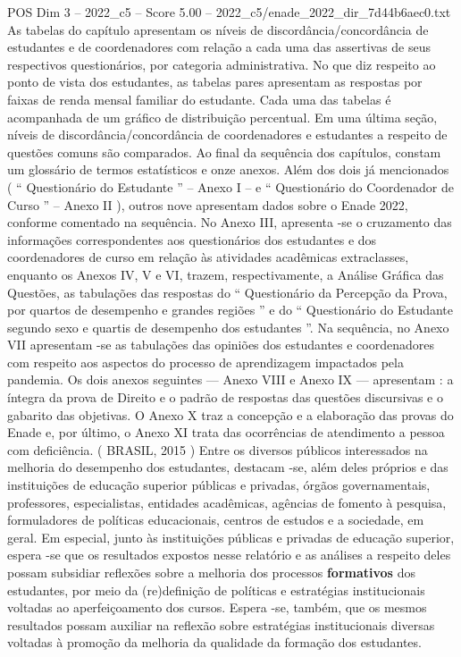 \begin{textsample}{POS Dim 3 – 2022\_c5 – Score 5.00 – 2022\_c5/enade\_2022\_dir\_7d44b6aec0.txt}
As tabelas do capítulo apresentam os níveis de discordância/concordância de estudantes e de coordenadores com relação a cada uma das assertivas de seus respectivos questionários, por categoria administrativa.
No que diz respeito ao ponto de vista dos estudantes, as tabelas pares apresentam as respostas por faixas de renda mensal familiar do estudante.
Cada uma das tabelas é acompanhada de um gráfico de distribuição percentual.
Em uma última seção, níveis de discordância/concordância de coordenadores e estudantes a respeito de questões comuns são comparados.
Ao final da sequência dos capítulos, constam um glossário de termos estatísticos e onze anexos.
Além dos dois já mencionados ( “ Questionário do Estudante ” – Anexo I – e “ Questionário do Coordenador de Curso ” – Anexo II ), outros nove apresentam dados sobre o Enade 2022, conforme comentado na sequência.
No Anexo III, apresenta -se o cruzamento das informações correspondentes aos questionários dos estudantes e dos coordenadores de curso em relação às atividades acadêmicas extraclasses, enquanto os Anexos IV, V e VI, trazem, respectivamente, a Análise Gráfica das Questões, as tabulações das respostas do “ Questionário da Percepção da Prova, por quartos de desempenho e grandes regiões ” e do “ Questionário do Estudante segundo sexo e quartis de desempenho dos estudantes ”.
Na sequência, no Anexo VII apresentam -se as tabulações das opiniões dos estudantes e coordenadores com respeito aos aspectos do processo de aprendizagem impactados pela pandemia.
Os dois anexos seguintes — Anexo VIII e Anexo IX — apresentam : a íntegra da prova de Direito e o padrão de respostas das questões discursivas e o gabarito das objetivas.
O Anexo X traz a concepção e a elaboração das provas do Enade e, por último, o Anexo XI trata das ocorrências de atendimento a pessoa com deficiência. ( BRASIL, 2015 ) Entre os diversos públicos interessados na melhoria do desempenho dos estudantes, destacam -se, além deles próprios e das instituições de educação superior públicas e privadas, órgãos governamentais, professores, especialistas, entidades acadêmicas, agências de fomento à pesquisa, formuladores de políticas educacionais, centros de estudos e a sociedade, em geral.
Em especial, junto às instituições públicas e privadas de educação superior, espera -se que os resultados expostos nesse relatório e as análises a respeito deles possam subsidiar reflexões sobre a melhoria dos processos \textbf{formativos} dos estudantes, por meio da (re)definição de políticas e estratégias institucionais voltadas ao aperfeiçoamento dos cursos.
Espera -se, também, que os mesmos resultados possam auxiliar na reflexão sobre estratégias institucionais diversas voltadas à promoção da melhoria da qualidade da formação dos estudantes.

\end{textsample}
